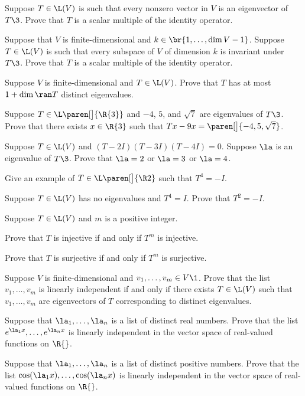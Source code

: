 \exercise
Suppose $T \in \L(V)$ is such that every nonzero vector in $V$ is an
eigenvector of~$T\3$.  Prove that $T$ is a scalar multiple of the identity operator.\label{388}


\exercise
Suppose that $V$ is finite-dimensional and $k \in \br{1, \ldots,\dim V - 1}$. Suppose $T \in \L(V)$ is such that every subspace of $V$ of dimension $k$ is invariant under~$T\3$.  Prove that $T$ is a scalar multiple of the identity operator.


\exercise
Suppose $V$ is finite-dimensional and $T \in \L(V)$.  Prove that $T$ has at most $1 + \dim \ran T$ distinct eigenvalues.


\exercise
Suppose $T \in \L\paren[\big]{\R{3}}$ and $-4$, $5$, and $ \sqrt{7}$ are eigenvalues of $T\3$. Prove that there exists $x \in \R{3}$ such that
$
Tx - 9x = \paren[\big]{-4, 5, \sqrt{7}}$.


\exercise
Suppose $T \in \L(V)$ and $(T-2I) (T-3 I) (T-4 I) = 0$. Suppose $\la$ is an eigenvalue of $T\3$. Prove that $\la = 2$ or $\la = 3$ or $\la = 4$.


\exercise
Give an example of $T \in \L\paren[\big]{\R2}$ such that $T^4 = -I$.


\exercise
Suppose $T \in \L(V)$ has no eigenvalues and $T^4 = I$. Prove that $T^2 = -I$.


\exercise
Suppose $T \in \L(V)$ and $m$ is a positive integer.
\begin{subtheorem}
\item
Prove that $T$ is injective if and only if $T^m$ is injective.
\item
Prove that $T$ is surjective if and only if $T^m$ is surjective.
\end{subtheorem}
\exercisesubtheoremend


\exercise
Suppose $V$ is finite-dimensional and $v_1, \dots, v_m \in V\1$. Prove that the list $v_1, \dots, v_m$ is linearly independent if and only if there exists $T \in \L(V)$ such that $v_1, \dots, v_m$ are eigenvectors of $T$ corresponding to distinct \mbox{eigenvalues}.


\exercise
Suppose that $\la_1, \dots, \la_n$ is a list of distinct real numbers. Prove that the list $e^{\la_1 x}, \dots, e^{\la_n x}$ is linearly independent in the vector space of real-valued functions on $\R{}$.


\exercise
Suppose that $\la_1, \dots, \la_n$ is a list of distinct positive numbers. Prove that the list $\cos(\la_1 x), \dots, \cos(\la_n x)$ is linearly independent in the vector space of real-valued functions on $\R{}$.


